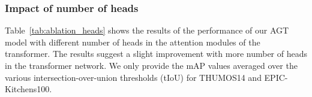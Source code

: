 \documentclass[10pt,twocolumn,letterpaper]{article}
\begin{document}
\subsubsection{Impact of number of heads}
\label{subsec:ablation_heads}
Table~\ref{tab:ablation_heads} shows the results of the performance of our AGT model with different number of heads in the attention modules of the transformer. The results suggest a slight improvement with more number of heads in the transformer network. We only provide the mAP values averaged over the various intersection-over-union thresholds (tIoU) for THUMOS14 and EPIC-Kitchens100.
\setlength{\tabcolsep}{4pt}
\renewcommand{\arraystretch}{1}
\begin{table}[t]
\centering
\caption{\textbf{Impact of number of heads.} We report performance of our AGT model with different number of heads in the attention modules of the transformer network. We report mAP for evaluation performance (higher is better). EPIC (A), EPIC (V), EPIC (N) indicates task `Action', `Verb', `Noun' classification on EPIC-Kitchens100. \#heads indicates number of heads in attention modules of the transformer.}
\vspace{-1mm}
\label{tab:ablation_heads}
\end{table}
 
\end{document}
